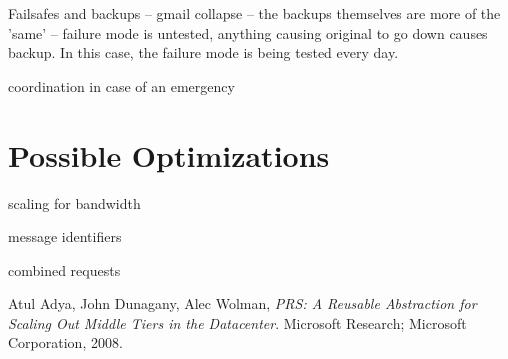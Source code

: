 \documentclass[11pt]{article}
\begin{document}
Failsafes and backups -- gmail collapse -- the backups themselves are more of the 'same' -- failure mode is untested, anything causing original to go down causes backup.
In this case, the failure mode is being tested every day.

coordination in case of an emergency

\section{Possible Optimizations}
scaling for bandwidth
   
message identifiers
   
combined requests

   
\begin{thebibliography}{1}

    Atul Adya, John Dunagany, Alec Wolman,
    \emph{PRS: A Reusable Abstraction for Scaling Out Middle Tiers in the Datacenter}.
    Microsoft Research; Microsoft Corporation,
    2008.
\end{thebibliography}
\end{document}
